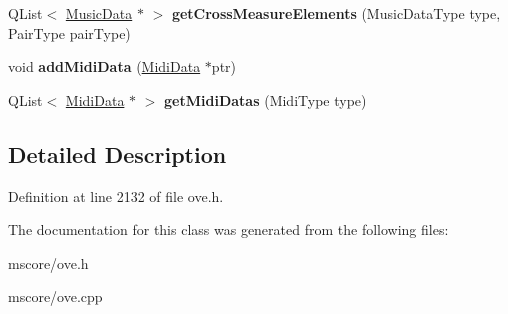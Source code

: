 \begin{DoxyCompactItemize}
Q\+List$<$ \hyperlink{class_o_v_e_1_1_music_data}{Music\+Data} $\ast$ $>$ {\bfseries get\+Cross\+Measure\+Elements} (Music\+Data\+Type type, Pair\+Type pair\+Type)
\item 
\mbox{\label{class_o_v_e_1_1_measure_data_afca2264c8d7892d08dc51796dc7894dd}} 
void {\bfseries add\+Midi\+Data} (\hyperlink{class_o_v_e_1_1_midi_data}{Midi\+Data} $\ast$ptr)
\item 
\mbox{\label{class_o_v_e_1_1_measure_data_a0d92a2e69d5df46e73af4d1a5e570061}} 
Q\+List$<$ \hyperlink{class_o_v_e_1_1_midi_data}{Midi\+Data} $\ast$ $>$ {\bfseries get\+Midi\+Datas} (Midi\+Type type)
\end{DoxyCompactItemize}


\subsection{Detailed Description}


Definition at line 2132 of file ove.\+h.



The documentation for this class was generated from the following files\+:\begin{DoxyCompactItemize}
\item 
mscore/ove.\+h\item 
mscore/ove.\+cpp\end{DoxyCompactItemize}
